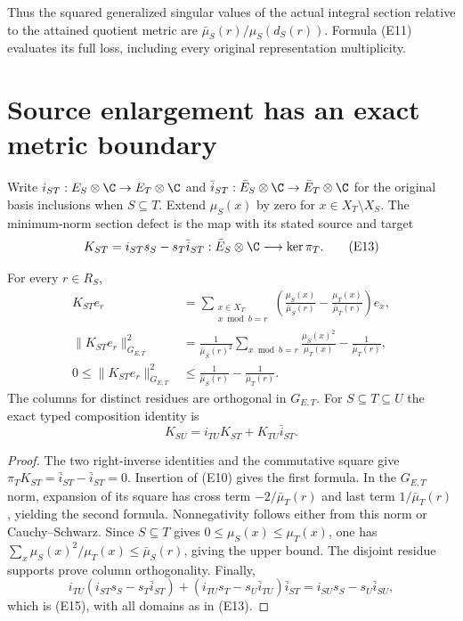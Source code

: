 Thus the squared generalized singular values of the actual integral
section relative to the attained quotient metric are
\(\bar\mu_S(r)/\mu_S(d_S(r))\).  Formula (E11) evaluates its full loss,
including every original representation multiplicity.

\section{Source enlargement has an exact metric boundary}

Write \(i_{ST}:E_S\otimes\C\to E_T\otimes\C\) and
\(\bar i_{ST}:\bar E_S\otimes\C\to\bar E_T\otimes\C\) for the original
basis inclusions when \(S\subseteq T\).  Extend \(\mu_S(x)\) by zero
for \(x\in X_T\setminus X_S\).  The minimum-norm section defect is the
map with its stated source and target
\[
 K_{ST}=i_{ST}s_S-s_T\bar i_{ST}:
    \bar E_S\otimes\C\longrightarrow\ker\pi_T.
 \tag{E13}
\]
\begin{proposition}
For every \(r\in R_S\),
\[
 \begin{split}
 K_{ST}e_r
   &=\sum_{\substack{x\in X_T\\x\bmod b=r}}
      \left(\frac{\mu_S(x)}{\bar\mu_S(r)}
           -\frac{\mu_T(x)}{\bar\mu_T(r)}\right)e_x,\\
 \|K_{ST}e_r\|_{G_{E,T}}^2
   &=\frac{1}{\bar\mu_S(r)^2}
        \sum_{x\bmod b=r}\frac{\mu_S(x)^2}{\mu_T(x)}
        -\frac1{\bar\mu_T(r)},\\
 0\leq\|K_{ST}e_r\|_{G_{E,T}}^2
   &\leq\frac1{\bar\mu_S(r)}-\frac1{\bar\mu_T(r)}.
 \end{split}
 \tag{E14}
\]
The columns for distinct residues are orthogonal in \(G_{E,T}\).  For
\(S\subseteq T\subseteq U\) the exact typed composition identity is
\[
 K_{SU}=i_{TU}K_{ST}+K_{TU}\bar i_{ST}.
 \tag{E15}
\]
\end{proposition}
\begin{proof}
The two right-inverse identities and the commutative square give
\(\pi_TK_{ST}=\bar i_{ST}-\bar i_{ST}=0\).
Insertion of (E10) gives the first formula.  In the \(G_{E,T}\) norm,
expansion of its square has cross term
\(-2/\bar\mu_T(r)\) and last term \(1/\bar\mu_T(r)\), yielding the
second formula.  Nonnegativity follows either from this norm or
Cauchy--Schwarz.  Since \(S\subseteq T\) gives
\(0\leq\mu_S(x)\leq\mu_T(x)\), one has
\(\sum_x\mu_S(x)^2/\mu_T(x)\leq\bar\mu_S(r)\), giving the upper bound.
The disjoint residue supports prove column orthogonality.  Finally,
\[
 i_{TU}(i_{ST}s_S-s_T\bar i_{ST})
 +(i_{TU}s_T-s_U\bar i_{TU})\bar i_{ST}
 =i_{SU}s_S-s_U\bar i_{SU},
 \]
which is (E15), with all domains as in (E13).
\end{proof}

